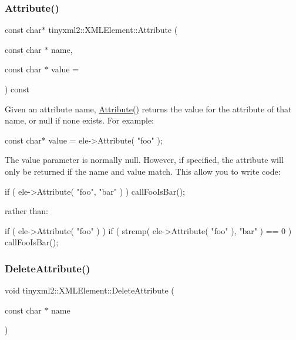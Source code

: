 \subsubsection{\texorpdfstring{Attribute()}{Attribute()}}
{\footnotesize\ttfamily const char$\ast$ tinyxml2\+::\+X\+M\+L\+Element\+::\+Attribute (\begin{DoxyParamCaption}\item[{const char $\ast$}]{name,  }\item[{const char $\ast$}]{value = {} }\end{DoxyParamCaption}) const}

Given an attribute name, \mbox{\hyperlink{classtinyxml2_1_1XMLElement_a70e49ed60b11212ae35f7e354cfe1de9}{Attribute()}} returns the value for the attribute of that name, or null if none exists. For example\+:

\begin{DoxyVerb}const char* value = ele->Attribute( "foo" );
\end{DoxyVerb}


The \textquotesingle{}value\textquotesingle{} parameter is normally null. However, if specified, the attribute will only be returned if the \textquotesingle{}name\textquotesingle{} and \textquotesingle{}value\textquotesingle{} match. This allow you to write code\+:

\begin{DoxyVerb}if ( ele->Attribute( "foo", "bar" ) ) callFooIsBar();
\end{DoxyVerb}


rather than\+: \begin{DoxyVerb}if ( ele->Attribute( "foo" ) ) {
    if ( strcmp( ele->Attribute( "foo" ), "bar" ) == 0 ) callFooIsBar();
}
\end{DoxyVerb}
 \mbox{\label{classtinyxml2_1_1XMLElement_aebd45aa7118964c30b32fe12e944628a}} 
\subsubsection{\texorpdfstring{DeleteAttribute()}{DeleteAttribute()}}
{\footnotesize\ttfamily void tinyxml2\+::\+X\+M\+L\+Element\+::\+Delete\+Attribute (\begin{DoxyParamCaption}\item[{const char $\ast$}]{name }\end{DoxyParamCaption})}

